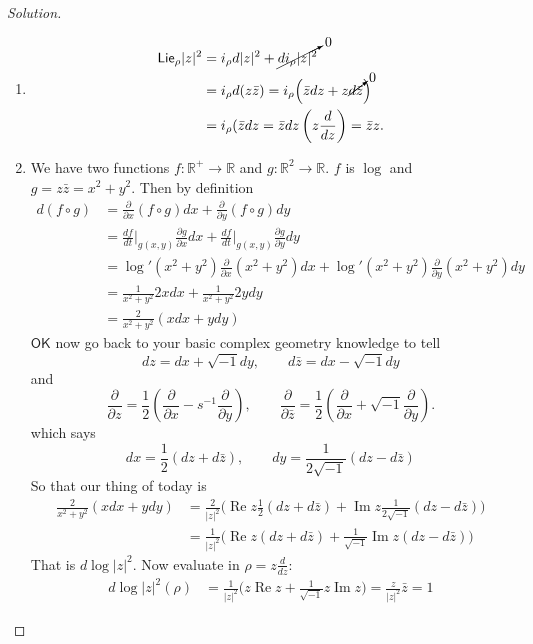 \begin{proof}[Solution]\leavevmode
\begin{enumerate}[label=(\alph*)]
\item
	 \begin{align*}
	\mathsf{Lie}_\rho |z|^2&=i_\rho d |z|^2 +\cancelto{0}{di_\rho |z|^2}\\
	&=i_\rho d(z \bar{z})=i_\rho \Big(\bar{z}dz +z \cancelto{0}{d \bar{z}} \Big)\\
	&=i_\rho( \bar{z}dz=\bar{z}dz\left(z \frac{d}{dz}\right) =\bar{z}z.
	\end{align*}

\item We have two functions \(f:\mathbb{R}^+ \to \mathbb{R}\) and \(g:\mathbb{R}^2 \to \mathbb{R}\). \(f\) is \(\operatorname{log}\) and \(g=z \bar{z}=x^2+y^2\). Then by definition
\begin{align*}
d(f \circ g)&=\frac{\partial }{\partial x}(f \circ g)dx+ \frac{\partial }{\partial y}(f \circ g) dy\\
&=\frac{df}{dt}\Big|_{g(x,y)}\frac{\partial g}{\partial x}dx+\frac{df}{dt}\Big|_{g(x,y)}\frac{\partial g}{\partial y}dy\\
&=\operatorname{log}'(x^2+y^2)\frac{\partial }{\partial x}(x^2+y^2)dx+\operatorname{log}'(x^2+y^2)\frac{\partial }{\partial y}(x^2+y^2)dy\\
&=\frac{1}{x^2+y^2}2xdx+\frac{1}{x^2+y^2}2ydy\\
&=\frac{2}{x^2+y^2}(xdx+ydy)
\end{align*}
$\mathsf{OK}$ now go back to your basic complex geometry knowledge to tell
\[dz=dx+\sqrt{-1}dy,\qquad d\bar{z}=dx-\sqrt{-1}dy\]
and
\[\frac{\partial }{\partial z}=\frac{1}{2}\left(\frac{\partial }{\partial x}-s^{-1}\frac{\partial }{\partial y}\right) ,\qquad \frac{\partial }{\partial \bar{z}}=\frac{1}{2}\left(\frac{\partial }{\partial x}+\sqrt{-1}\frac{\partial }{\partial y}\right) .\]
which says
\[dx=\frac{1}{2}\left(dz+d\bar{z}\right) ,\qquad dy=\frac{1}{2\sqrt{-1}}(dz-d\bar{z})\]
So that our thing of today is
\begin{align*}
\frac{2}{x^2+y^2}(xdx+ydy)&=\frac{2}{|z|^2}\Big(\operatorname{Re}z\frac{1}{2}(dz+d\bar{z})+\operatorname{Im}z\frac{1}{2\sqrt{-1}}(dz-d\bar{z})\Big)\\
			  &=\frac{1}{|z|^2}\Big(\operatorname{Re}z(dz +d\bar{z})+\frac{1}{\sqrt{-1}}\operatorname{Im}z(dz-d\bar{z})\Big)
\end{align*}
That is  \(d \operatorname{log}|z|^2\). Now evaluate in \(\rho=z\frac{d}{dz}\):
\begin{align*}
d\operatorname{log}|z|^2(\rho)&=\frac{1}{|z|^2}\Big(z\operatorname{Re}z+\frac{1}{\sqrt{-1}}z\operatorname{Im}z\Big)=\frac{z}{|z|^2}\bar{z}=1
\end{align*}


\end{enumerate}
\end{proof}

